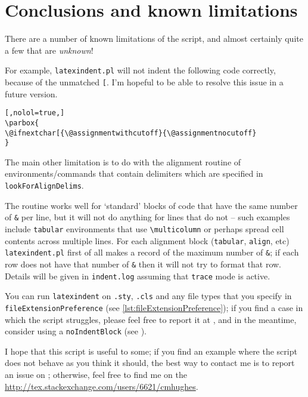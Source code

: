\section{Conclusions and known limitations}\label{sec:knownlimitations}
 There are a number of known limitations of the script, and almost certainly quite a
 few that are \emph{unknown}!

 For example, \texttt{latexindent.pl} will not indent the following code correctly,
 because of the unmatched \lstinline![!. I'm hopeful to be able to resolve this
 issue in a future version.

 \begin{lstlisting}[,nolol=true,]
\parbox{
\@ifnextchar[{\@assignmentwithcutoff}{\@assignmentnocutoff}
}
\end{lstlisting}

 The main other limitation is to do with the alignment routine of environments/commands that contain
 delimiters which are specified in \texttt{lookForAlignDelims}.

 The routine works well for `standard' blocks of code that have the same number of \lstinline!&!
 per line, but it will not do anything for lines that do not -- such examples
 include \texttt{tabular} environments that use \lstinline!\multicolumn! or
 perhaps spread cell contents across multiple lines.  For each alignment block (\texttt{tabular},
 \texttt{align}, etc) \texttt{latexindent.pl} first of all makes a record
 of the maximum number of \lstinline!&!; if each row does not have that
 number of \lstinline!&! then it will not try to format that row. Details
 will be given in \texttt{indent.log} assuming that \texttt{trace} mode
 is active.

 You can run \texttt{latexindent} on \texttt{.sty}, \texttt{.cls} and any file types
 that you specify in \lstinline[breaklines=true]!fileExtensionPreference! (see \vref{lst:fileExtensionPreference});
 if you find a case in which the script struggles, please feel free
 to report it at \cite{latexindent-home}, and
 in the meantime, consider using a \texttt{noIndentBlock} (see ).

 I hope that this script is useful to some; if you find an example where the
 script does not behave as you think it should, the best way to contact me is to
 report an issue on \cite{latexindent-home}; otherwise, feel free to find me on
 the \url{http://tex.stackexchange.com/users/6621/cmhughes}.
